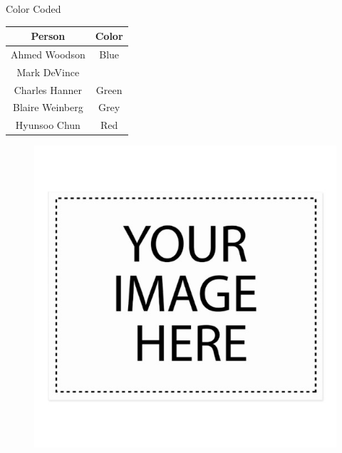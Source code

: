 \documentclass[10pt]{beamer}
\begin{document}
	\begin{frame}{Color Coded}
\begin{minipage}{0.4\textwidth}
\begin{table}
	\begin{tabular}{|c|c|}\hline
		\textbf{Person} & \textbf{Color}\\ \hline
		Ahmed Woodson & Blue\\ \hline
		Mark DeVince & {}\\  \hline
		Charles Hanner & Green\\ \hline
		Blaire Weinberg & Grey\\  \hline
		Hyunsoo Chun & Red\\ \hline
	\end{tabular}
\end{table}	
\end{minipage}%
\begin{minipage}{0.59\textwidth}
	\begin{figure}
		\centering
		\includegraphics[width=\textwidth]{Color_Coded.png}
	\end{figure}
\end{minipage}
\end{frame}
\end{document}
